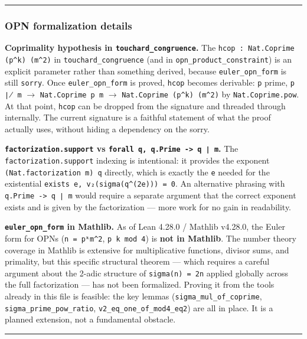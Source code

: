 \documentclass[10pt,a4paper]{article}
\begin{document}
\begin{center}
\rule{0.5\textwidth}{0.4pt}
\end{center}

\subsubsection{OPN formalization details}

\textbf{Coprimality hypothesis in \texttt{touchard\_congruence}.} The \texttt{hcop : Nat.Coprime (p\^{}k) (m\^{}2)} in
\texttt{touchard\_congruence} (and in \texttt{opn\_product\_constraint}) is an explicit parameter rather than
something derived, because \texttt{euler\_opn\_form} is still \texttt{sorry}. Once \texttt{euler\_opn\_form} is proved,
\texttt{hcop} becomes derivable: \texttt{p} prime, \texttt{p ∤ m} $\rightarrow$ \texttt{Nat.Coprime p m} $\rightarrow$
\texttt{Nat.Coprime (p\^{}k) (m\^{}2)} by \texttt{Nat.Coprime.pow}. At that point, \texttt{hcop} can be dropped from the
signature and threaded through internally. The current signature is a faithful statement of what
the proof actually uses, without hiding a dependency on the sorry.

\textbf{\texttt{factorization.support} vs \texttt{forall q, q.Prime -\textgreater{} q ∣ m}.} The \texttt{factorization.support} indexing is
intentional: it provides the exponent \texttt{(Nat.factorization m) q} directly, which is exactly the
\texttt{e} needed for the existential \texttt{exists e, v₂(sigma(q\^{}(2e))) = 0}. An alternative phrasing with
\texttt{q.Prime -\textgreater{} q ∣ m} would require a separate argument that the correct exponent exists and is
given by the factorization --- more work for no gain in readability.

\textbf{\texttt{euler\_opn\_form} in Mathlib.} As of Lean 4.28.0 / Mathlib v4.28.0, the Euler form for OPNs
(\texttt{n = pᵏm\^{}2}, \texttt{p \equiv k  mod 4}) is \textbf{not in Mathlib}. The number theory coverage in Mathlib
is extensive for multiplicative functions, divisor sums, and primality, but this specific
structural theorem --- which requires a careful argument about the 2-adic structure of \texttt{sigma(n) = 2n}
applied globally across the full factorization --- has not been formalized. Proving it from the
tools already in this file is feasible: the key lemmas (\texttt{sigma\_mul\_of\_coprime},
\texttt{sigma\_prime\_pow\_ratio}, \texttt{v2\_eq\_one\_of\_mod4\_eq2}) are all in place. It is a planned extension,
not a fundamental obstacle.

\begin{center}
\rule{0.5\textwidth}{0.4pt}
\end{center}
\end{document}
